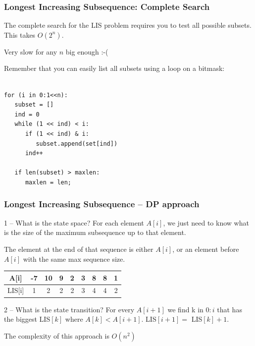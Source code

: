 \documentclass{beamer}
\begin{document}
\begin{frame}[fragile]
  \frametitle{Longest Increasing Subsequence: Complete Search}

  The complete search for the LIS problem requires you to test
  all possible subsets. This takes $O(2^n)$.

  \bigskip

  Very slow for any $n$ big enough :-(

  {\small
  \begin{block}{}
    Remember that you can easily list all subsets using a loop on a bitmask:
    {\smaller
\begin{verbatim}

for (i in 0:1<<n):
   subset = []
   ind = 0
   while (1 << ind) < i:
      if (1 << ind) & i:
         subset.append(set[ind])
      ind++

   if len(subset) > maxlen:
      maxlen = len;
\end{verbatim}
    }
  \end{block}}
\end{frame}

\begin{frame}
  \frametitle{Longest Increasing Subsequence -- DP approach}
  {\smaller
  \begin{block}{1 -- What is the state space?}
    For each element $A[i]$, we just need to know what is the size of
    the maximum subsequence up to that element.

    \medskip

    The element at the end of that sequence is either $A[i]$, or an element
    before $A[i]$ with the same max sequence size.
  \end{block}

  \bigskip

  \begin{tabular}{|c|c|c|c|c|c|c|c|c|}
    \hline
    A[i] & -7 & 10 & 9 & 2 & 3 & 8 & 8 & 1\\
    \hline
    LIS[i] & 1 & 2 & 2 & 2 & 3 & 4 & 4 & 2\\
    \hline
  \end{tabular}

  \begin{block}{2 -- What is the state transition?}
    For every $A[i+1]$ we find k in $0:i$ that has the biggest
    LIS$[k]$ where $A[k] < A[i+1]$. LIS$[i+1] =$ LIS$[k] + 1$.
  \end{block}

  The complexity of this approach is $O(n^2)$
  }
\end{frame}
\end{document}
